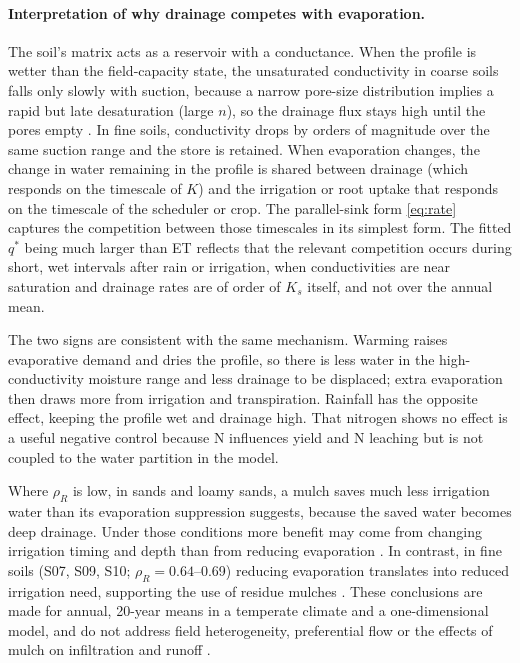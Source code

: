 \paragraph{Interpretation of why drainage competes with evaporation.}
The soil's matrix acts as a reservoir with a conductance. When the profile is wetter than the field-capacity state, the unsaturated conductivity in coarse soils falls only slowly with suction, because a narrow pore-size distribution implies a rapid but late desaturation (large $n$), so the drainage flux stays high until the pores empty \citep{Hillel1998,Brady2016}. In fine soils, conductivity drops by orders of magnitude over the same suction range and the store is retained. When evaporation changes, the change in water remaining in the profile is shared between drainage (which responds on the timescale of $K$) and the irrigation or root uptake that responds on the timescale of the scheduler or crop. The parallel-sink form \cref{eq:rate} captures the competition between those timescales in its simplest form. The fitted $q^\ast$ being much larger than ET reflects that the relevant competition occurs during short, wet intervals after rain or irrigation, when conductivities are near saturation and drainage rates are of order of $K_s$ itself, and not over the annual mean.

The two signs are consistent with the same mechanism. Warming raises evaporative demand and dries the profile, so there is less water in the high-conductivity moisture range and less drainage to be displaced; extra evaporation then draws more from irrigation and transpiration. Rainfall has the opposite effect, keeping the profile wet and drainage high. That nitrogen shows no effect is a useful negative control because N influences yield and N leaching but is not coupled to the water partition in the model.

Where $\rho_R$ is low, in sands and loamy sands, a mulch saves much less irrigation water than its evaporation suppression suggests, because the saved water becomes deep drainage. Under those conditions more benefit may come from changing irrigation timing and depth than from reducing evaporation \citep{Fereres2007,Playan2006}. In contrast, in fine soils (S07, S09, S10; $\rho_R=0.64$--0.69) reducing evaporation translates into reduced irrigation need, supporting the use of residue mulches \citep{BalwinderSingh2011,Vuaille2024}. These conclusions are made for annual, 20-year means in a temperate climate and a one-dimensional model, and do not address field heterogeneity, preferential flow or the effects of mulch on infiltration and runoff \citep{Jarvis2007,Beven2013}.

